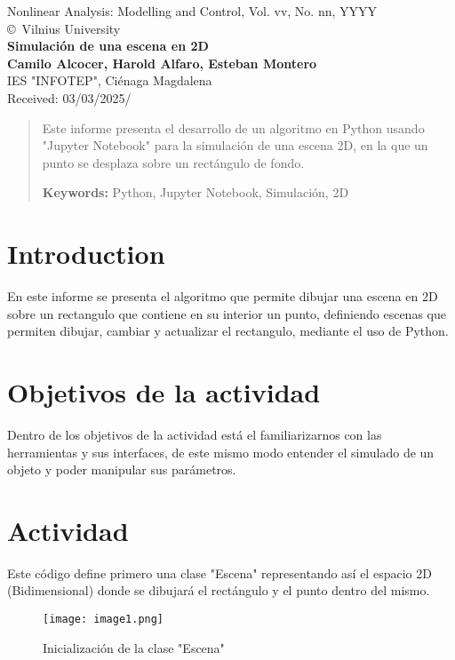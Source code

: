\documentclass[a4paper, 10pt]{article}
\begin{document}
\begin{center}
Nonlinear Analysis: Modelling and Control, Vol. vv, No. nn, YYYY\\
\copyright\ Vilnius University\\[24pt]
\LARGE
\textbf{Simulación de una escena en 2D}\\[6pt]
\small
\textbf {Camilo Alcocer, Harold Alfaro, Esteban Montero}\\[6pt]
IES "INFOTEP", Ciénaga Magdalena \\[6pt]
Received: 03/03/2025\quad/\quad
\end{center}

\begin{abstract}
Este informe presenta el desarrollo de un algoritmo en Python usando "Jupyter Notebook" para la simulación de una escena 2D, en la que un punto se desplaza sobre un rectángulo de fondo. \vskip 2mm

\textbf{Keywords:} Python, Jupyter Notebook, Simulación, 2D

\end{abstract}



\section{Introduction}\label{s:1}
En este informe se presenta el algoritmo que permite dibujar una escena en 2D sobre un rectangulo que contiene en su interior un punto, definiendo escenas que permiten dibujar, cambiar y actualizar el rectangulo, mediante el uso de Python. 

\section{Objetivos de la actividad}\label{s:2}
Dentro de los objetivos de la actividad está el familiarizarnos con las herramientas y sus interfaces, de este mismo modo entender el simulado de un objeto y poder manipular sus parámetros.

\section{Actividad}\label{s:2.1}
Este código define primero una clase "Escena" representando así el espacio 2D (Bidimensional) donde se dibujará el rectángulo y el punto dentro del mismo. 

\begin{figure}[ht]
\centering
\texttt{[image: image1.png]}
\caption{Inicialización de la clase "Escena"}\label{fig:1}
\end{figure}
\end{document}
